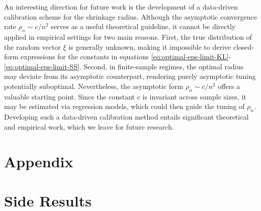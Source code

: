 \documentclass[11pt]{article}
\begin{document}
An interesting direction for future work is the development of a data-driven calibration scheme for the shrinkage radius. Although the asymptotic convergence rate $\rho_n \sim c/n^2$  serves as a useful theoretical guideline, it cannot be directly applied in empirical settings for two main reasons. First, the true distribution of the random vector $\xi$ is generally unknown, making it impossible to derive closed-form expressions for the constants in equations \eqref{eq:optimal-eps-limit-KL}-\eqref{eq:optimal-eps-limit-SS}. Second, in finite-sample regimes, the optimal radius may deviate from its asymptotic counterpart, rendering purely asymptotic tuning potentially suboptimal.
Nevertheless, the asymptotic form $\rho_n \sim c/n^2$ offers a valuable starting point. Since the constant c is invariant across sample sizes, it may be estimated via regression models, which could then guide the tuning of $\rho_n$. Developing such a data-driven calibration method entails significant theoretical and empirical work, which we leave for future research.








\newpage




\clearpage

\appendix
\section*{Appendix}

\section{Side Results}
\end{document}
